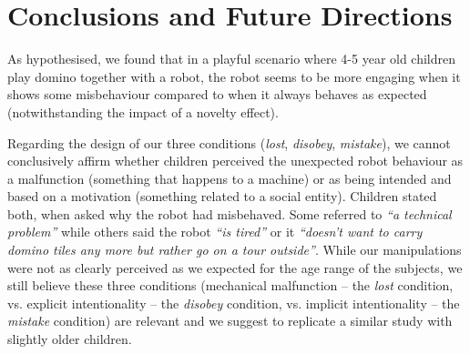 \documentclass[letterpaper, 10pt, conference]{ieeeconf}
\begin{document}
\section{Conclusions and Future Directions}


As hypothesised, we found that in a playful scenario where 4-5 year old children
play domino together with a robot, the robot seems to be more engaging when it
shows some misbehaviour compared to when it always behaves as expected
(notwithstanding the impact of a novelty effect).

Regarding the design of our three conditions (\emph{lost},
\emph{disobey}, \emph{mistake}), we cannot conclusively affirm whether children perceived the
unexpected robot behaviour as a malfunction (something that happens to a
machine) or as being intended and based on a motivation (something related to a
social entity). Children stated both, when asked why the robot had misbehaved.
Some referred to \textit{``a technical problem''} while others said the robot
\textit{``is tired''} or it \textit{``doesn't want to carry domino tiles any
more but rather go on a tour outside''}. While our manipulations were not as
clearly perceived as we expected for the age range of the subjects, we still
believe these three conditions (mechanical malfunction -- the \emph{lost}
condition, vs. explicit intentionality -- the \emph{disobey} condition, vs.
implicit intentionality -- the \emph{mistake} condition) are relevant and we
suggest to replicate a similar study with slightly older children.


\end{document}
